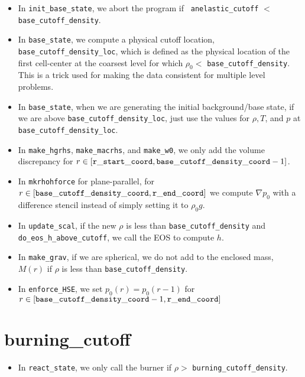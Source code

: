 \begin{itemize}

\item In {\tt init\_base\_state}, we abort the program if {\tt
  anelastic\_cutoff} $<$ {\tt base\_cutoff\_density}.

\item In {\tt base\_state}, we compute a physical cutoff location,
  {\tt base\_cutoff\_density\_loc}, which is defined as the physical
  location of the first cell-center at the coarsest level for which
  $\rho_0 <$ {\tt base\_cutoff\_density}.  This is a trick used for making
  the data consistent for multiple level problems.

\item In {\tt base\_state}, when we are generating the initial
  background/base state, if we are above {\tt base\_cutoff\_density\_loc}, 
  just use the values for $\rho,T$, and $p$ at {\tt base\_cutoff\_density\_loc}.

\item In {\tt make\_hgrhs}, {\tt make\_macrhs}, and {\tt make\_w0}, 
  we only add the volume discrepancy for
  $r\in[{\tt r\_start\_coord},{\tt base\_cutoff\_density\_coord}-1]$.

\item In {\tt mkrhohforce} for plane-parallel, for
  $r\in[{\tt base\_cutoff\_density\_coord},{\tt r\_end\_coord}]$ we
  compute $\nabla p_0$ with a difference stencil instead of simply
  setting it to $\rho_0 g$.

\item In {\tt update\_scal}, if the new $\rho$ is less than 
  {\tt base\_cutoff\_density} and {\tt do\_eos\_h\_above\_cutoff},  
  we call the EOS to compute $h$.

\item In {\tt make\_grav}, if we are spherical, we do not add to the
  enclosed mass, $M(r)$ if $\rho$ is less than {\tt base\_cutoff\_density}.

\item In {\tt enforce\_HSE}, we set $p_0(r) = p_0(r-1)$ for 
  $r\in[{\tt base\_cutoff\_density\_coord}-1,{\tt r\_end\_coord}]$

\end{itemize}

\section{burning\_cutoff}

\begin{itemize}

\item In {\tt react\_state}, we only call the burner if 
  $\rho >$ {\tt burning\_cutoff\_density}.

\end{itemize}

